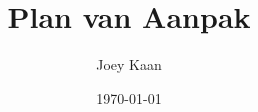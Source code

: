 \renewcommand{\contentsname}{Inhoudsopgave}

\title{Plan van Aanpak}
\author{Joey Kaan}
\date{\today}




\maketitle
\thispagestyle{empty}
\clearpage


